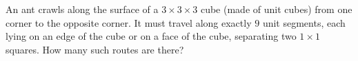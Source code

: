 An ant crawls along the surface of a $3\times3\times3$ cube (made of unit cubes) from one corner to the opposite corner. It must travel along exactly $9$ unit segments, each lying on an edge of the cube or on a face of the cube, separating two $1\times1$ squares. How many such routes are there?
